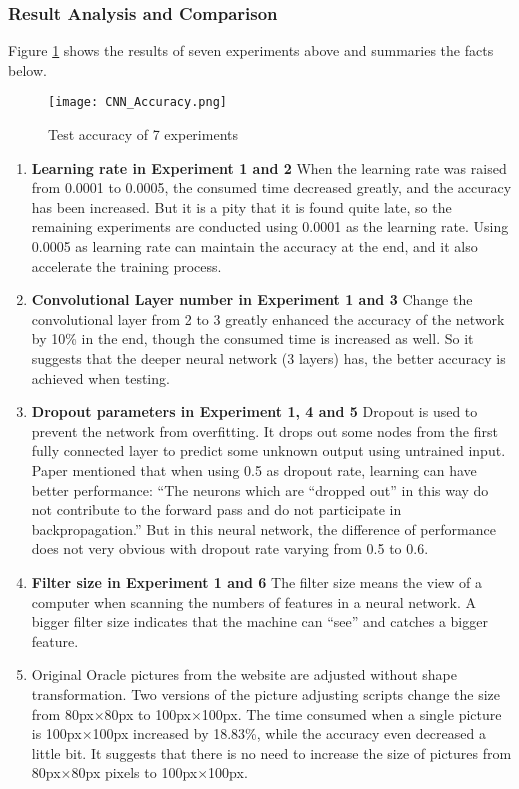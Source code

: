 \subsubsection{Result Analysis and Comparison}
Figure \ref{fig:accuracy} shows the results of seven experiments above and summaries the facts below.
\begin{figure}[h]
	\centering
	\texttt{[image: CNN\_Accuracy.png]}
	\caption{Test accuracy of 7 experiments}
	\label{fig:accuracy}
\end{figure}
\begin{enumerate}
	\item \textbf{Learning rate in Experiment 1 and 2} When the learning rate was raised from 0.0001 to 0.0005, the consumed time decreased greatly, and the accuracy has been increased. But it is a pity that it is found quite late, so the remaining experiments are conducted using 0.0001 as the learning rate. Using 0.0005 as learning rate can maintain the accuracy at the end, and it also accelerate the training process.
	\item \textbf{Convolutional Layer number in Experiment 1 and 3} Change the convolutional layer from 2 to 3 greatly enhanced the accuracy of the network by 10\% in the end, though the consumed time is increased as well. So it suggests that the deeper neural network (3 layers) has, the better accuracy is achieved when testing.
	\item \textbf{Dropout parameters in Experiment 1, 4 and 5} Dropout is used to prevent the network from overfitting. It drops out some nodes from the first fully connected layer to predict some unknown output using untrained input. Paper \cite{Krizhevsky:2012:ICD:2999134.2999257} mentioned that when using 0.5 as dropout rate, learning can have better performance: ``The neurons which are ``dropped out'' in this way do not contribute to the forward pass and do not participate in backpropagation.'' But in this neural network, the difference of performance does not very obvious with dropout rate varying from 0.5 to 0.6.
	\item \textbf{Filter size in Experiment 1 and 6} The filter size means the view of a computer when scanning the numbers of features in a neural network. A bigger filter size indicates that the machine can ``see'' and catches a bigger feature.
	\item {} Original Oracle pictures from the website are adjusted without shape transformation. Two versions of the picture adjusting scripts change the size from 80px$ \times $80px to 100px$ \times $100px. The time consumed when a single picture is 100px$ \times $100px increased by 18.83\%, while the accuracy even decreased a little bit. It suggests that there is no need to increase the size of pictures from 80px$ \times $80px pixels to 100px$ \times $100px.
\end{enumerate}

